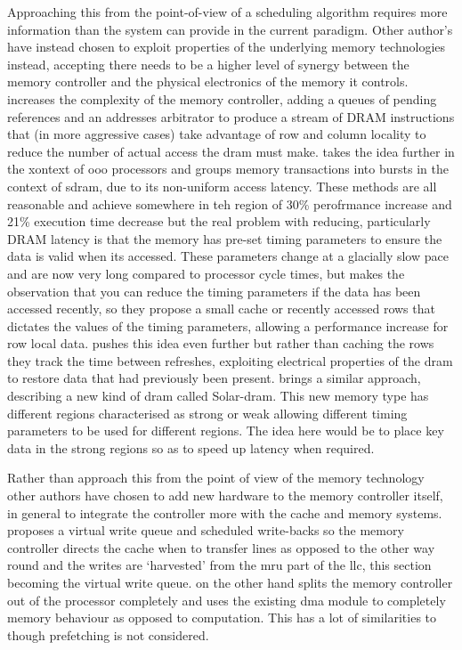Approaching this from the point-of-view of a scheduling algorithm requires more information than the system can provide in the current paradigm. Other author's have instead chosen to exploit properties of the underlying memory technologies instead, accepting there needs to be a higher level of synergy between the memory controller and the physical electronics of the memory it controls. \citet{rixnerMemoryAccessScheduling2000} increases the complexity of the memory controller, adding a queues of pending references and an addresses arbitrator to produce a stream of DRAM instructions that (in more aggressive cases) take advantage of row and column locality to reduce the number of actual access the \gls{dram} must make. \citet{shaoBurstSchedulingAccess2007} takes the idea further in the xontext of \gls{ooo} processors and groups memory transactions into bursts in the context of \gls{sdram}, due to its non-uniform access latency. These methods are all reasonable and achieve somewhere in teh region of 30\% perofrmance increase \cite{rixnerMemoryAccessScheduling2000} and 21\% execution time decrease \cite{shaoBurstSchedulingAccess2007} but the real problem with reducing, particularly DRAM latency is that the memory has pre-set timing parameters to ensure the data is valid when its accessed. These parameters change at a glacially slow pace and are now very long compared to processor cycle times, but \citet{hassanChargeCacheReducingDRAM2016} makes the observation that you can reduce the timing parameters if the data has been accessed recently, so they propose a small cache or recently accessed rows that dictates the values of the timing parameters, allowing a performance increase for row local data. \citet{shinDRAMLatencyOptimizationInspired2016} pushes this idea even further but rather than caching the rows they track the time between refreshes, exploiting electrical properties of the \gls{dram} to restore data that had previously been present. \citet{kimSolarDRAMReducingDRAM2018} brings a similar approach, describing a new kind of \gls{dram} called Solar-\gls{dram}. This new memory type has different regions characterised as strong or weak allowing different timing parameters to be used for different regions. The idea here would be to place key data in the strong regions so as to speed up latency when required. 

Rather than approach this from the point of view of the memory technology other authors have chosen to add new hardware to the memory controller itself, in general to integrate the controller more with the cache and memory systems. \citet{stuecheliCoordinatingDRAMLastLevelCache2011} proposes a virtual write queue and scheduled write-backs so the memory controller directs the cache when to transfer lines as opposed to the other way round and the writes are `harvested' from the \gls{mru} part of the \gls{llc}, this section becoming the virtual write queue. \citet{waslyHidingMemoryLatency2014} on the other hand splits the memory controller out of the processor completely and uses the existing \gls{dma} module to completely memory behaviour as opposed to computation. This has a lot of similarities to \citet{veidenbaumDecoupledAccessDRAM1997} though prefetching is not considered.

